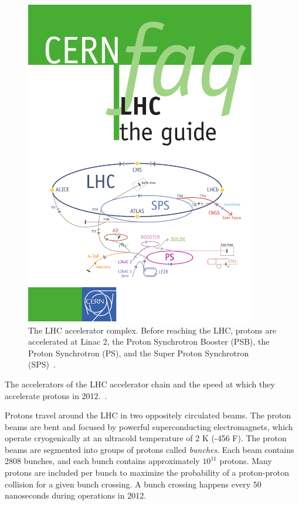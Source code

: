 \begin{figure}[tp]
  \centering
  \includegraphics[width=0.90\textwidth]{figures/lhc-atlas/lhc-accelerator-complex}
  \caption{The LHC accelerator complex. Before reaching the LHC, protons are accelerated at Linac 2, the Proton Synchrotron Booster (PSB), the Proton Synchrotron (PS), and the Super Proton Synchrotron (SPS)~\cite{cern-faq}.}
  \label{fig:lhc-complex}
\end{figure}

\begin{table}[bp]
  \centering
  \renewcommand{\arraystretch}{1.4}
  \caption{The accelerators of the LHC accelerator chain and the speed at which they accelerate protons in 2012.~\cite{cern-faq}.}
  
  \label{tab:experiment-lhc-speeds}
\end{table}

Protons travel around the LHC in two oppositely circulated beams. The proton beams are bent and focused by powerful superconducting electromagnets, which operate cryogenically at an ultracold temperature of 2 K (-456 F). The proton beams are segmented into groups of protons called \textit{bunches}. Each beam contains 2808 bunches, and each bunch contains approximately $10^{11}$ protons. Many protons are included per bunch to maximize the probability of a proton-proton collision for a given bunch crossing. A bunch crossing happens every 50 nanoseconds during operations in 2012.

